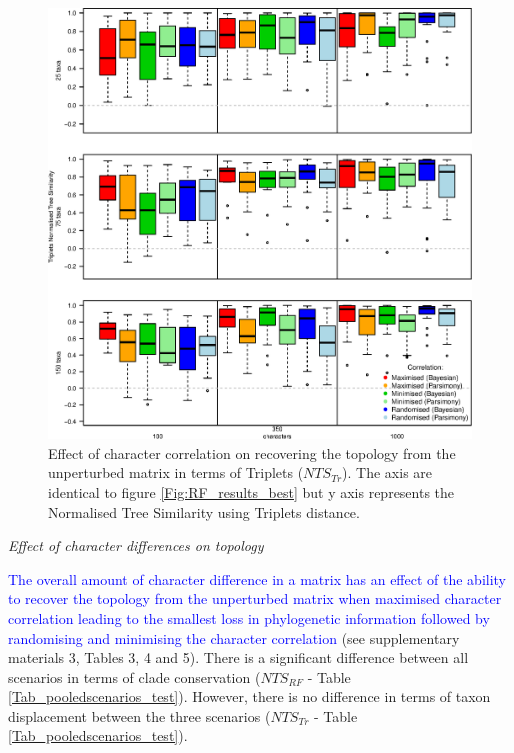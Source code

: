 \documentclass[12pt,letterpaper]{article}
\renewcommand{\subsection}[1]{%
\bigskip
\begin{center}
\begin{large}
\normalfont\itshape #1
\end{large}
\end{center}}
\begin{document}
\begin{figure}[!htbp]
\centering
   \includegraphics[width=1\textwidth]{Tr_results_best.eps}
\caption{Effect of character correlation on recovering the topology from the unperturbed matrix in terms of Triplets ($NTS_{Tr}$). The axis are identical to figure \ref{Fig:RF_results_best} but y axis represents the Normalised Tree Similarity using Triplets distance.}
\label{Fig:Tr_results_best}
\end{figure}

\subsection{Effect of character differences on topology}
\textcolor{blue}{The overall amount of character difference in a matrix has an effect of the ability to recover the topology from the unperturbed matrix when maximised character correlation leading to the smallest loss in phylogenetic information followed by randomising and minimising the character correlation} (see supplementary materials 3, Tables 3, 4 and 5).
There is a significant difference between all scenarios in terms of clade conservation ($NTS_{RF}$ - Table \ref{Tab_pooledscenarios_test}).
However, there is no difference in terms of taxon displacement between the three scenarios ($NTS_{Tr}$ - Table \ref{Tab_pooledscenarios_test}).
\end{document}
